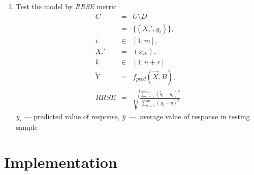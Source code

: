 \documentclass{beamer}
\newcounter{saveenumi}
\newcommand{\seti}{\setcounter{saveenumi}{\value{enumi}}}
\newcommand{\conti}{\setcounter{enumi}{\value{saveenumi}}}
\begin{document}
\begin{frame}
	\begin{enumerate}
		\conti
		\item Test the model by \textit{RRSE} metric
			\begin{eqnarray}
				C &=& U \setminus D \\
				  &=& \{ (X_i', y_i) \}, \\
				i &\in & [1;m], \\
				X_i' &=& (x_{ik}), \\
				k &\in & [1;n+r] \\
				\tilde{Y} &=& f_{pred} (\vec{X}, B), \\
				RRSE &=& \sqrt{ \frac{ \sum\limits_{i=1}^m { ( \tilde{y_i}-y_i )^2 } }
				                     { \sum\limits_{i=1}^m { ( y_i - \bar{y} )^2 } } }
			\end{eqnarray}
		$\tilde{y_i}$ --- predicted value of response, $\bar{y}$~---~average value of response in testing sample
		\seti
	\end{enumerate}
\end{frame}

\section{Implementation}
\end{document}
